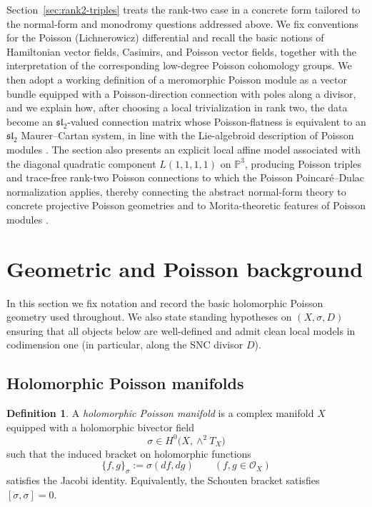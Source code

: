 \documentclass[11pt]{amsart}
\theoremstyle{plain}
\theoremstyle{definition}
\newtheorem{definition}[theorem]{Definition}
\theoremstyle{definition}
\newcommand{\OO}{\mathcal{O}}
\begin{document}
Section~\ref{sec:rank2-triples} treats the rank-two case in a concrete form tailored to the normal-form and monodromy questions addressed above. We fix conventions for the Poisson (Lichnerowicz) differential and recall the basic notions of Hamiltonian vector fields, Casimirs, and Poisson vector fields, together with the interpretation of the corresponding low-degree Poisson cohomology groups. We then adopt a working definition of a meromorphic Poisson module as a vector
bundle equipped with a Poisson-direction connection with poles along a divisor, and we explain how,
after choosing a local trivialization in rank two, the data become an $\mathfrak{sl}_2$-valued
connection matrix whose Poisson-flatness is equivalent to an $\mathfrak{sl}_2$ Maurer--Cartan system,
in line with the Lie-algebroid description of Poisson modules \cite{Polishchuk97,LGV13}. The section
also presents an explicit local affine model associated with the diagonal quadratic component
$L(1,1,1,1)$ on $\mathbb{P}^3$, producing Poisson triples and trace-free rank-two Poisson
connections to which the Poisson Poincar\'e--Dulac normalization applies, thereby connecting the
abstract normal-form theory to concrete projective Poisson geometries \cite{Pym18} and to
Morita-theoretic features of Poisson modules \cite{Cor20}.
\section{Geometric and Poisson background}\label{sec:background}

In this section we fix notation and record the basic holomorphic Poisson geometry used throughout.
We also state standing hypotheses on $(X,\sigma,D)$ ensuring that all objects below are well-defined
and admit clean local models in codimension one (in particular, along the SNC divisor $D$).

\subsection{Holomorphic Poisson manifolds}

\begin{definition}\label{def:holPois}
A \emph{holomorphic Poisson manifold} is a complex manifold $X$ equipped with a holomorphic bivector field
$$
\sigma \in H^0\big(X,\wedge^2 T_X\big)
$$
such that the induced bracket on holomorphic functions
$$
\{f,g\}_\sigma := \sigma(df,dg)\qquad (f,g\in\OO_X)
$$
satisfies the Jacobi identity. Equivalently, the Schouten bracket satisfies $[\sigma,\sigma]=0$.
\end{definition}
\end{document}
